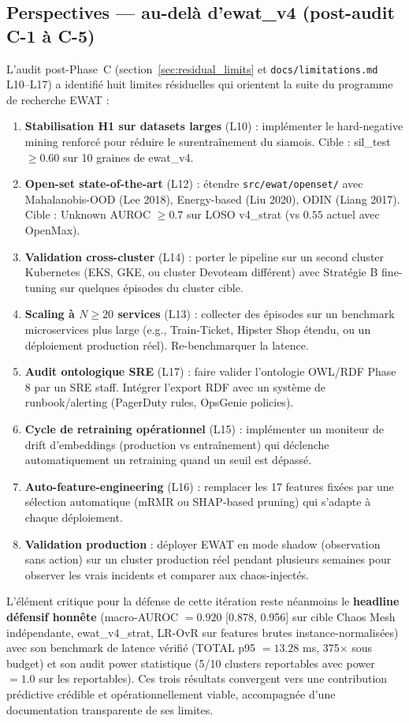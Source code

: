 \subsection{Perspectives --- au-delà d'ewat\_v4 (post-audit C-1 à C-5)}
\label{sec:future_work}

L'audit post-Phase~C (section~\ref{sec:residual_limits} et
\texttt{docs/limitations.md} L10--L17) a identifié huit limites résiduelles qui
orientent la suite du programme de recherche EWAT :

\begin{enumerate}
  \item \textbf{Stabilisation H1 sur datasets larges} (L10) : implémenter
    le hard-negative mining renforcé pour réduire le surentraînement du siamois.
    Cible : sil\_test $\geq 0.60$ sur 10 graines de ewat\_v4.
  \item \textbf{Open-set state-of-the-art} (L12) : étendre
    \texttt{src/ewat/openset/} avec Mahalanobis-OOD (Lee 2018), Energy-based
    (Liu 2020), ODIN (Liang 2017). Cible : Unknown AUROC $\geq 0.7$ sur LOSO
    v4\_strat (vs $0.55$ actuel avec OpenMax).
  \item \textbf{Validation cross-cluster} (L14) : porter le pipeline sur un
    second cluster Kubernetes (EKS, GKE, ou cluster Devoteam différent) avec
    Stratégie B fine-tuning sur quelques épisodes du cluster cible.
  \item \textbf{Scaling à $N \geq 20$ services} (L13) : collecter des épisodes
    sur un benchmark microservices plus large (e.g., Train-Ticket, Hipster Shop
    étendu, ou un déploiement production réel). Re-benchmarquer la latence.
  \item \textbf{Audit ontologique SRE} (L17) : faire valider l'ontologie OWL/RDF
    Phase 8 par un SRE staff. Intégrer l'export RDF avec un système de
    runbook/alerting (PagerDuty rules, OpsGenie policies).
  \item \textbf{Cycle de retraining opérationnel} (L15) : implémenter un
    moniteur de drift d'embeddings (production vs entraînement) qui déclenche
    automatiquement un retraining quand un seuil est dépassé.
  \item \textbf{Auto-feature-engineering} (L16) : remplacer les 17 features
    fixées par une sélection automatique (mRMR ou SHAP-based pruning) qui
    s'adapte à chaque déploiement.
  \item \textbf{Validation production} : déployer EWAT en mode shadow
    (observation sans action) sur un cluster production réel pendant
    plusieurs semaines pour observer les vrais incidents et comparer aux
    chaos-injectés.
\end{enumerate}

L'élément critique pour la défense de cette itération reste néanmoins le
\textbf{headline défensif honnête} (macro-AUROC $= 0.920$ [0.878, 0.956] sur
cible Chaos Mesh indépendante, ewat\_v4\_strat, LR-OvR sur features brutes
instance-normalisées) avec son benchmark de latence vérifié (TOTAL p95
$= 13.28$ ms, 375$\times$ sous budget) et son audit power statistique
(5/10 clusters reportables avec power $= 1.0$ sur les reportables). Ces trois
résultats convergent vers une contribution prédictive crédible et opérationnellement
viable, accompagnée d'une documentation transparente de ses limites.
